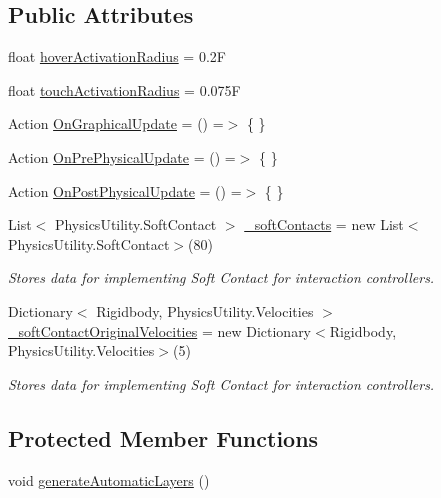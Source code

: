 \subsection*{Public Attributes}
\begin{DoxyCompactItemize}
\item 
float \mbox{\hyperlink{class_leap_1_1_unity_1_1_interaction_1_1_interaction_manager_a64d2d9e76c9c255c51cceab432176b7e}{hover\+Activation\+Radius}} = 0.\+2F
\item 
float \mbox{\hyperlink{class_leap_1_1_unity_1_1_interaction_1_1_interaction_manager_abab33ed7036f6694c970e0f7a73254f3}{touch\+Activation\+Radius}} = 0.\+075F
\item 
Action \mbox{\hyperlink{class_leap_1_1_unity_1_1_interaction_1_1_interaction_manager_a8db1a9bcd11e194d99df929b8bddcdcc}{On\+Graphical\+Update}} = () =$>$ \{ \}
\item 
Action \mbox{\hyperlink{class_leap_1_1_unity_1_1_interaction_1_1_interaction_manager_ac5ca2a8716263ba7c473cf120fd5dca2}{On\+Pre\+Physical\+Update}} = () =$>$ \{ \}
\item 
Action \mbox{\hyperlink{class_leap_1_1_unity_1_1_interaction_1_1_interaction_manager_ae1d1c4819b9762af4d1633e2c14ee7b1}{On\+Post\+Physical\+Update}} = () =$>$ \{ \}
\item 
List$<$ Physics\+Utility.\+Soft\+Contact $>$ \mbox{\hyperlink{class_leap_1_1_unity_1_1_interaction_1_1_interaction_manager_a70605cd65741d1ec3409745fdf09c3ee}{\+\_\+soft\+Contacts}} = new List$<$Physics\+Utility.\+Soft\+Contact$>$(80)
\begin{DoxyCompactList}\small\item\em Stores data for implementing Soft Contact for interaction controllers. \end{DoxyCompactList}\item 
Dictionary$<$ Rigidbody, Physics\+Utility.\+Velocities $>$ \mbox{\hyperlink{class_leap_1_1_unity_1_1_interaction_1_1_interaction_manager_a049c0b24c30386942bb3abe7d3118b6e}{\+\_\+soft\+Contact\+Original\+Velocities}} = new Dictionary$<$Rigidbody, Physics\+Utility.\+Velocities$>$(5)
\begin{DoxyCompactList}\small\item\em Stores data for implementing Soft Contact for interaction controllers. \end{DoxyCompactList}\end{DoxyCompactItemize}
\subsection*{Protected Member Functions}
\begin{DoxyCompactItemize}
\item 
void \mbox{\hyperlink{class_leap_1_1_unity_1_1_interaction_1_1_interaction_manager_ac412bb63a1141bba69c9f898cea2b1db}{generate\+Automatic\+Layers}} ()
\end{DoxyCompactItemize}
